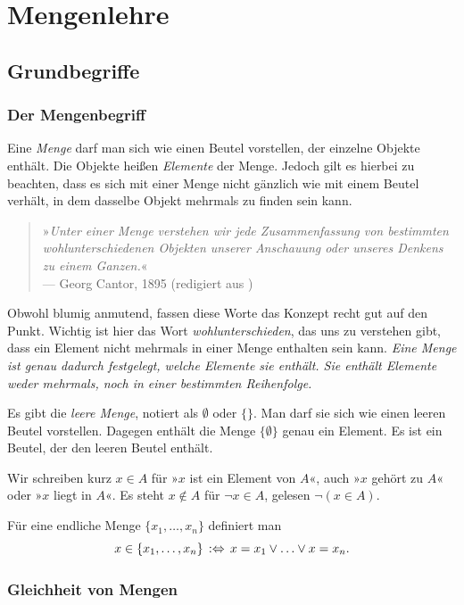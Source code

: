 
\chapter{Mengenlehre}

\section{Grundbegriffe}

\subsection{Der Mengenbegriff}

Eine \emph{Menge} darf man sich wie einen Beutel
vorstellen, der einzelne Objekte enthält. Die Objekte heißen
\emph{Elemente} der Menge. Jedoch gilt es hierbei zu
beachten, dass es sich mit einer Menge nicht gänzlich wie mit einem
Beutel verhält, in dem dasselbe Objekt mehrmals zu finden sein kann.
\begin{quote}
»\emph{Unter einer Menge verstehen wir jede Zusammenfassung von
bestimmten wohlunterschiedenen Objekten unserer Anschauung oder
unseres Denkens zu einem Ganzen.}«\\
--- Georg Cantor, 1895 (redigiert aus \cite{Cantor})
\end{quote}
Obwohl blumig anmutend, fassen diese Worte das Konzept recht gut
auf den Punkt. Wichtig ist hier das Wort \emph{wohlunterschieden},
das uns zu verstehen gibt, dass ein Element nicht mehrmals in einer
Menge enthalten sein kann. \emph{Eine Menge ist genau dadurch festgelegt,
welche Elemente sie enthält. Sie enthält Elemente weder mehrmals, noch
in einer bestimmten Reihenfolge.}

Es gibt die \emph{leere Menge}, notiert als
$\emptyset$ oder $\{\}$. Man darf sie sich wie einen leeren Beutel
vorstellen. Dagegen enthält die Menge $\{\emptyset\}$ genau ein Element.
Es ist ein Beutel,  der den leeren Beutel enthält.

Wir schreiben kurz $x\in A$ für »$x$ ist ein Element von $A$«,
auch »$x$ gehört zu $A$« oder »$x$ liegt in $A$«.
Es steht $x\notin A$ für $\lnot x\in A$, gelesen $\lnot (x\in A)$.

Für eine endliche Menge $\{x_1,\ldots,x_n\}$ definiert man
\[x\in\{x_1,\ldots,x_n\}\,:\Leftrightarrow\, x=x_1\lor\ldots\lor x=x_n.\]

\subsection{Gleichheit von Mengen}

